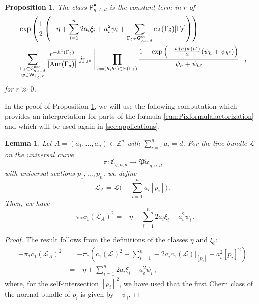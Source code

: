\documentclass[a4paper,12pt]{article} %
\newcommand{\ca}[1]{{\mathcal{#1}}}
\def\P{\mathsf{P}}
\def\Aut{{\rm Aut}}
\def\E{\mathrm{E}}
\def\V{\mathrm{V}}
\def\G{\mathsf{G}}
\theoremstyle{definition}
\theoremstyle{plain}%
\newtheorem{proposition}[definition]{Proposition}
\newtheorem{lemma}[definition]{Lemma}
\newcommand{\Picabs}{\mathfrak{Pic}}
\begin{document}
\begin{proposition} \label{Lem:Pixformulafactorization}
The class $\P_{g,A,d}^{\bullet}$ is the constant term in $r$ of
\begin{align} \label{eqn:Pixformulafactorization}
&\exp\left(\frac12 \left( -\eta + \sum_{i=1}^n 2 a_i \xi_i+ a_i^2 \psi_i  + \sum_{\Gamma_\delta \in \G_{g,n,d}^\textup{se}} c_A(\Gamma_\delta) [\Gamma_\delta] \right) \right) \\ &\sum_{
\substack{\Gamma_\delta\in \G_{g,n,d}^\textup{nse} \\
w\in \mathsf{W}_{\Gamma_\delta,r}}
}
\frac{r^{-h^1(\Gamma_\delta)}}{|\Aut(\Gamma_\delta)| }
\;
j_{\Gamma_\delta*}\Bigg[
\prod_{e=(h,h')\in \E(\Gamma_\delta)}
\frac{1-\exp\left(-\frac{w(h)w(h')}2(\psi_h+\psi_{h'})\right)}{\psi_h + \psi_{h'}} \Bigg]\, , \nonumber
\end{align}
for $r \gg 0$.
\end{proposition}
In the proof of Proposition \ref{Lem:Pixformulafactorization}, we will use the following computation which provides an interpretation for parts of the formula \eqref{eqn:Pixformulafactorization} and which will be used again in \cref{sec:applications}. 
\begin{lemma} \label{Lem:vertterm}
Let $A = (a_1,\ldots,a_n) \in \mathbb{Z}^n$
with $\sum_{i=1}^n a_i=d$.
 For the line bundle $\mathcal{L}$ on the universal curve $$\pi:\mathfrak{C}_{g,n,d} \to \Picabs_{g,n,d}$$
 with universal sections $p_1, \ldots, p_n$, we define $$\mathcal{L}_A = \mathcal{L}\Big(- \sum_{i=1}^n a_i [p_i]\Big)\, .$$ Then, we have
    \[- \pi_* c_1(\mathcal{L}_A)^2=
    -\eta + \sum_{i=1}^n 2 a_i \xi_i+ a_i^2 \psi_i\, .\]
\end{lemma}
\begin{proof} The result follows from the definitions of the classes $\eta$ and $\xi_i$:
\begin{align*}
- \pi_* c_1(\mathcal{L}_A)^2 &= - \pi_* \left(c_1(\ca L)^2 +  \sum_{i=1}^n - 2 a_i c_1(\ca L)|_{[p_i]} + a_i^2 [p_i]^2  \right) \\
&=-\eta + \sum_{i=1}^n 2 a_i \xi_i+ a_i^2 \psi_i\,,
\end{align*}
where, for the self-intersection $[p_i]^2$, we have used that the first Chern class of the normal bundle of $p_i$ is given by $- \psi_i$.
\end{proof}
\end{document}

